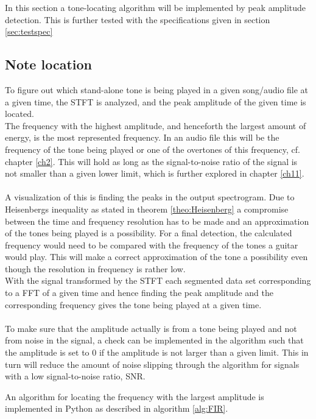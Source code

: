 \label{sec:peak_detection}
In this section a tone-locating algorithm will be implemented by peak amplitude detection.
This is further tested with the specifications given in section \ref{sec:testspec}
\subsection{Note location}
To figure out which stand-alone tone is being played in a given song/audio file at a given time, the STFT is analyzed, and the peak amplitude of the given time is located.\\
The frequency with the highest amplitude, and henceforth the largest amount of energy, is the most represented frequency. 
In an audio file this will be the frequency of the tone being played or one of the overtones of this frequency, cf. chapter \ref{ch2}.
This will hold as long as the signal-to-noise ratio of the signal is not smaller than a given lower limit, which is further explored in chapter \ref{ch11}.
\\
\\
A visualization of this is finding the peaks in the output spectrogram.
Due to Heisenbergs inequality as stated in theorem \ref{theo:Heisenberg} a compromise between the time and frequency resolution has to be made and an approximation of the tones being played is a possibility.
For a final detection, the calculated frequency would need to be compared with the frequency of the tones a guitar would play.
This will make a correct approximation of the tone a possibility even though the resolution in frequency is rather low.
\\
With the signal transformed by the STFT each segmented data set corresponding to a FFT of a given time and hence finding the peak amplitude and the corresponding frequency gives the tone being played at a given time.
\\\\
To make sure that the amplitude actually is from a tone being played and not from noise in the signal, a check can be implemented in the algorithm such that the amplitude is set to $0$ if the amplitude is not larger than a given limit.
This in turn will reduce the amount of noise slipping through the algorithm for signals with a low signal-to-noise ratio, SNR.

An algorithm for locating the frequency with the largest amplitude is implemented in Python as described in algorithm \ref{alg:FIR}.

